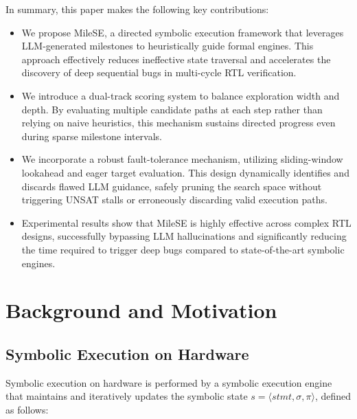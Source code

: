 \documentclass[conference]{IEEEtran}
\begin{document}

In summary, this paper makes the following key contributions:
\begin{itemize}
    \item We propose MileSE, a directed symbolic execution framework that leverages LLM-generated milestones to heuristically guide formal engines. This approach effectively reduces ineffective state traversal and accelerates the discovery of deep sequential bugs in multi-cycle RTL verification.
    
    \item We introduce a dual-track scoring system to balance exploration width and depth. By evaluating multiple candidate paths at each step rather than relying on naive heuristics, this mechanism sustains directed progress even during sparse milestone intervals.
    
    \item We incorporate a robust fault-tolerance mechanism, utilizing sliding-window lookahead and eager target evaluation. This design dynamically identifies and discards flawed LLM guidance, safely pruning the search space without triggering UNSAT stalls or erroneously discarding valid execution paths.
    
    \item Experimental results show that MileSE is highly effective across complex RTL designs, successfully bypassing LLM hallucinations and significantly reducing the time required to trigger deep bugs compared to state-of-the-art symbolic engines.
\end{itemize}



\section{Background and Motivation}
\label{sec:background}

\subsection{Symbolic Execution on Hardware}
Symbolic execution on hardware is performed by a symbolic execution engine that maintains and iteratively updates the symbolic state $s = \langle stmt, \sigma, \pi \rangle$, defined as follows:
\end{document}
